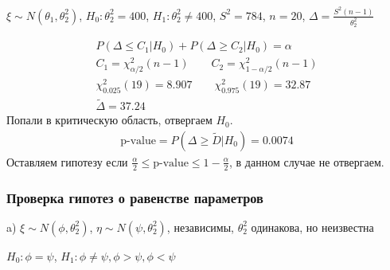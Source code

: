 \documentclass{article}
\begin{document}
\begin{eg}
  $\xi \sim N(\theta_1, \theta_2^{2})$, $H_0: \theta_2^{2}=40 0$, $H_1:\theta_2^{2}\neq 40 0$,
  $S^{2}=784$, $n=20$, $\Delta = \frac{S^{2}(n-1)}{\theta_2^{2}} $

  \begin{gather*}
    P(\Delta \le C_1 | H_0) + P(\Delta \ge C_2 | H_0) = \alpha\\ 
    C_1= \chi^{2}_{\alpha/2}(n-1) \qquad C_2 = \chi^{2}_{1-\alpha/2}(n-1) \\ 
    \chi^{2}_{0.025}(19)=8.907 \qquad \chi^{2}_{0.975}(19)=32.87 \\ 
    \tilde{\Delta}=37.24
  \end{gather*}
  Попали в критическую область, отвергаем $H_0$.
  \begin{gather*}
    \text{p-value}=P(\Delta \ge \tilde{D} | H_0)=0.0 074
  \end{gather*}
  Оставляем гипотезу если $\frac{\alpha}{2}\le \text{p-value} \le 1- \frac{\alpha}{2}$,
  в данном случае не отвергаем.
\end{eg}

\subsubsection{Проверка гипотез о равенстве параметров}
a) $\xi \sim N(\phi, \theta_2^{2})$, $\eta \sim N(\psi, \theta_2^{2})$, 
независимы, $\theta_2^{2}$ одинакова, но неизвестна

$H_0: \phi=\psi$, $H_1: \phi \neq \psi, \phi > \psi, \phi < \psi$
\end{document}
